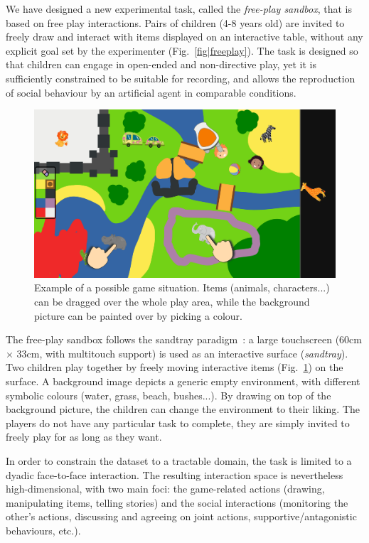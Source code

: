 \documentclass[sigconf]{acmart}
\begin{document}
We have designed a new experimental task, called the \emph{free-play sandbox},
that is based on free play interactions. Pairs of children (4-8 years old) are
invited to freely draw and interact with items displayed on an interactive
table, without any explicit goal set by the experimenter
(Fig.~\ref{fig|freeplay}).  The task is designed so that children can engage in
open-ended and non-directive play, yet it is sufficiently constrained to be
suitable for recording, and allows the reproduction of social behaviour by an
artificial agent in comparable conditions.

\begin{figure}[ht!]
    \centering
    \includegraphics[width=0.9\columnwidth]{sandbox}
    \caption{Example of a possible game situation. Items (animals,
    characters...) can be dragged over the whole play area, while the background
    picture can be painted over by picking a colour.}

    \label{fig|sandbox}
\end{figure}

The free-play sandbox follows the sandtray
paradigm~\cite{baxter2012touchscreen}: a large touchscreen (60cm $\times$ 33cm,
with multitouch support) is used as an interactive surface (\emph{sandtray}).
Two children play together by freely moving interactive items
(Fig.~\ref{fig|sandbox}) on the surface. A background image depicts a generic
empty environment, with different symbolic colours (water, grass, beach,
bushes...). By drawing on top of the background picture, the children can change
the environment to their liking. The players do not have any particular task to
complete, they are simply invited to freely play for as long as they want.


In order to constrain the dataset to a tractable domain, the task is limited to
a dyadic face-to-face interaction.  The resulting interaction space is
nevertheless high-dimensional, with two main foci: the game-related actions
(drawing, manipulating items, telling stories) and the social interactions
(monitoring the other's actions, discussing and agreeing on joint actions,
supportive/antagonistic behaviours, etc.).
\end{document}
